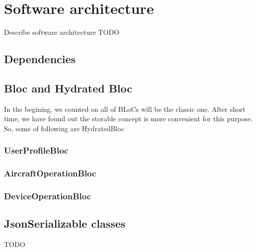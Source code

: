 \chapter{Software architecture}
Describe software architecture
TODO
\section{Dependencies}

\section{Bloc and Hydrated Bloc}
In the begining, we counted on all of BLoCs will be the classic one. After short time, we have found out the storable concept is more convenient for this purpose. So, some of following are HydratedBloc

\subsection{UserProfileBloc}

\subsection{AircraftOperationBloc}

\subsection{DeviceOperationBloc}

\section{JsonSerializable classes}


TODO